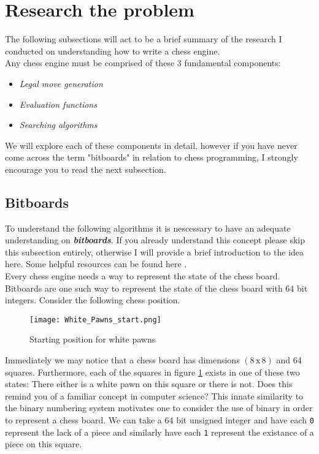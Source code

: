 \section{Research the problem}
The following subsections will act to be 
a brief summary of the research I conducted on understanding
how to write a chess engine.\\

Any chess engine must be comprised of these 3 fundamental components:
\begin{itemize}
  \item \textit{Legal move generation}
  \item \textit{Evaluation functions}
  \item \textit{Searching algorithms}\\
\end{itemize}

We will explore each of these components in detail, however 
if you have never come across the term "bitboards" in 
relation to chess programming, I strongly 
encourage you to read the next subsection.

\subsection*{Bitboards}
To understand the following algorithms it is nescessary to 
have an adequate understanding on \textbf{\textit{bitboards}}.
If you already understand this concept please skip this 
subsection entirely, otherwise I will provide a brief 
introduction to the idea here. Some helpful resources can be
found here \cite{bitboards}.\\

Every chess engine needs a way to represent the state of the
chess board. Bitboards are one such way to represent the
state of the chess board with 64 bit integers. Consider
the following chess position.

\begin{figure}[h]
  \texttt{[image: White\_Pawns\_start.png]}
  \centering
  \caption{Starting position for white pawns}
  \label{whitepawns}
\end{figure}

Immediately we may notice that a chess board has dimensions
$(8 \, \textrm{x} \, 8)$ and 64 squares. Furthermore, 
each of the squares in figure \ref{whitepawns} exists 
in one of these two states: There either is a white pawn on
this square or there is not. Does this remind you of a 
familiar concept in computer science? This innate similarity to 
the binary numbering system motivates one to consider the 
use of binary in order to represent a chess board. We can take a 
64 bit unsigned integer and have each \texttt{0} 
represent the lack of a piece and similarly 
have each \texttt{1} represent the existance of a piece on 
this square.\\

